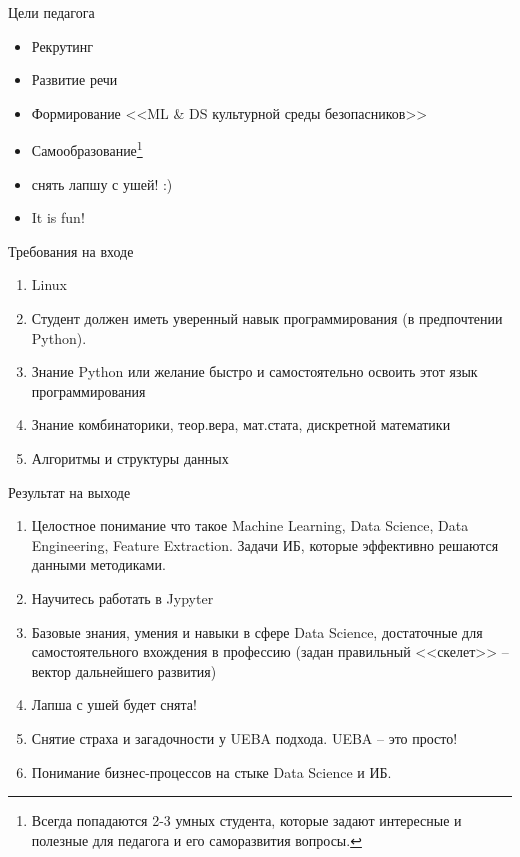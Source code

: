     
  \begin{frame}{Цели педагога}
  	\begin{itemize}
  		\item Рекрутинг
  		\item Развитие речи
  		\item Формирование <<ML \& DS культурной среды безопасников>>
  		\item Самообразование\footnote{
  		Всегда попадаются 2-3 умных студента, которые задают интересные и полезные для педагога и его саморазвития вопросы.}
  	    \item снять лапшу с ушей! :)
  		\item It is fun!
	\end{itemize}
  \end{frame}
  
  \begin{frame}{Требования на входе}
  \begin{enumerate}
  	\item Linux
  	\item Студент должен иметь уверенный навык программирования
  	(в предпочтении Python).
  	\item Знание Python или желание быстро и самостоятельно освоить этот 
  	язык программирования
  	\item Знание комбинаторики, теор.вера, мат.стата, дискретной математики
  	\item Алгоритмы и структуры данных
  \end{enumerate}
  \end{frame}

   \begin{frame}{Результат на выходе}
   \begin{enumerate}
     \item Целостное понимание что такое 
     Machine Learning, 
     Data Science, 
     Data Engineering, 
     Feature Extraction.
     Задачи ИБ, которые эффективно решаются данными методиками.
     \item Научитесь работать в Jypyter
     \item Базовые знания, умения и навыки 
     в сфере Data Science,
     достаточные для самостоятельного вхождения в профессию
     (задан правильный <<скелет>> -- вектор дальнейшего развития)
     \item Лапша с ушей будет снята!
     \item Снятие страха и загадочности у UEBA подхода. 
     UEBA -- это просто!
     \item Понимание бизнес-процессов на стыке
     Data Science и ИБ.
   \end{enumerate}
   \end{frame}

